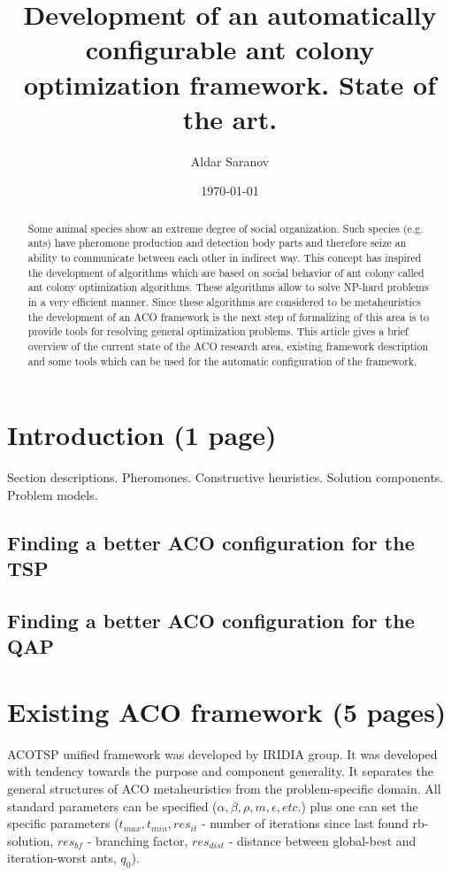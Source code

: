 \documentclass[12pt]{article}
\author{Aldar Saranov}
\date{\today}
\title{Development of an automatically configurable ant colony optimization framework. State of the art.}
\begin{document}
\maketitle 
\newpage

\tableofcontents
\newpage

\begin{abstract}
Some animal species show an extreme degree of social organization. Such species (e.g. ants) have pheromone production and detection body parts and therefore seize an ability to communicate between each other in indirect way. This concept has inspired the development of algorithms which are based on social behavior of ant colony called ant colony optimization algorithms. These algorithms allow to solve NP-hard problems in a very efficient manner. Since these algorithms are considered to be metaheuristics the development of an ACO framework is the next step of formalizing of this area is to provide tools for resolving general optimization problems. This article gives a brief overview of the current state of the ACO research area, existing framework description and some tools which can be used for the automatic configuration of the framework.
\end{abstract}




\section{Introduction (1 page)}
Section descriptions.
Pheromones.
Constructive heuristics.
Solution components.
Problem models.







\subsection{Finding a better ACO configuration for the TSP}


\subsection{Finding a better ACO configuration for the QAP}


\section{Existing ACO framework (5 pages)}

ACOTSP unified framework was developed by IRIDIA group. It was developed with tendency towards the purpose and component generality. It separates the general structures of ACO metaheuristics from the problem-specific domain. All standard parameters can be specified ($\alpha, \beta, \rho, m, \epsilon, etc.$) plus one can set the specific parameters ($t_{max}, t_{min}, res_{it}$ - number of iterations since last found rb-solution, $res_{bf}$ - branching factor, $res_{dist}$ - distance between global-best and iteration-worst ants, $q_0$).
\end{document}
